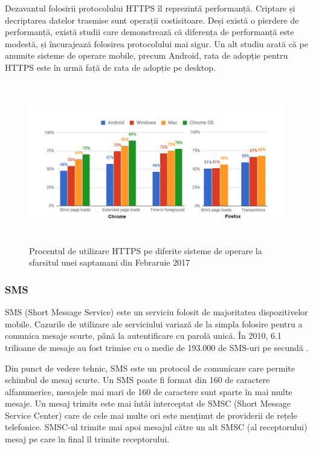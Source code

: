 \documentclass[12pt]{article}
\begin{document}
Dezavantul folosirii protocolului HTTPS îl reprezintă performanță. Criptare și decriptarea datelor trasmise sunt
operații costisitoare. Deși există o pierdere de performanță, există studii \cite{goldberg1998comparison} care demonstrează
că diferența de performanță este modestă, și încurajează folosirea protocolului mai sigur. Un alt studiu \cite{felt2017measuring}
arată că pe anumite sisteme de operare mobile, precum Android, rata de adopție pentru HTTPS este în urmă față de rata de adopție
pe desktop. 

\begin{figure}[H]
\centering
\includegraphics[width=15cm, height=7cm]{http.png}
\caption{Procentul de utilizare HTTPS pe diferite sisteme de operare la sfarsitul unei saptamani din
Febraruie 2017 \cite{felt2017measuring}}
\end{figure}

\subsubsection{SMS}

SMS (Short Message Service) este un serviciu folosit de majoritatea dispozitivelor mobile. Cazurile de 
utilizare ale serviciului variază de la simpla folosire pentru a comunica mesaje scurte, până la 
autentificare cu parolă unică. În 2010, 6.1 trilioane de mesaje au fost trimise cu o medie de 193.000 de SMS-uri
pe secundă \cite{riseof3g}. 


Din punct de vedere tehnic, SMS este un protocol de comunicare care permite schimbul de mesaj scurte. Un SMS 
poate fi format din 160 de caractere alfanumerice, mesajele mai mari de 160 de caractere sunt sparte în 
mai multe mesaje. 
Un mesaj trimits este mai întâi interceptat de SMSC (Short Message Service Center) care de cele mai multe ori
este menținut de providerii de rețele telefonice. SMSC-ul trimite mai apoi mesajul către un alt SMSC (al receptorului)
mesaj pe care în final îl trimite receptorului.
\end{document}
